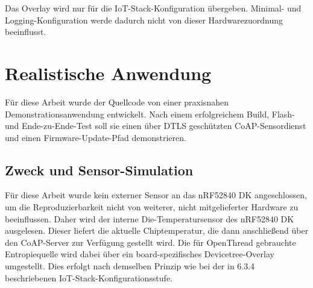 Das Overlay wird nur f{\"u}r die IoT-Stack-Konfiguration {\"u}bergeben. Minimal- und Logging-Konfiguration werde dadurch nicht von dieser Hardwarezuordnung beeinflusst.

\section{Realistische Anwendung}
F{\"u}r diese Arbeit wurde der Quellcode von einer praxisnahen Demonstrationsanwendung entwickelt. Nach einem erfolgreichem Build, Flash- und Ende-zu-Ende-Test soll sie einen {\"u}ber DTLS gesch{\"u}tzten CoAP-Sensordienst und einen Firmware-Update-Pfad demonstrieren.

\subsection{Zweck und Sensor-Simulation}
F{\"u}r diese Arbeit wurde kein externer Sensor an das nRF52840 DK angeschlossen, um die Reproduzierbarkeit nicht von weiterer, nicht mitgelieferter Hardware zu beeinflussen. Daher wird der interne Die-Temperatursensor des nRF52840 DK ausgelesen. Dieser liefert die aktuelle Chiptemperatur, die dann anschlie{\ss}end {\"u}ber den CoAP-Server zur Verf{\"u}gung gestellt wird. Die f{\"u}r OpenThread gebrauchte Entropiequelle wird dabei {\"u}ber ein board-spezifisches Devicetree-Overlay umgestellt. Dies erfolgt nach demselben Prinzip wie bei der in 6.3.4 beschriebenen IoT-Stack-Konfigurationsstufe.

